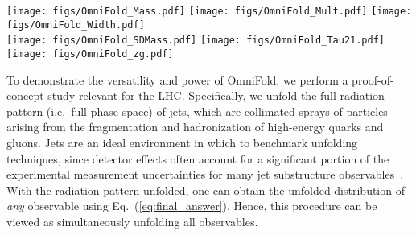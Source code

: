 \documentclass[prl,twocolumn,superscriptaddress,longbibliography,preprintnumbers,nofootinbib]{revtex4-1}
\DeclareRobustCommand{\Eq}[1]{Eq.~(\ref{eq:#1})}
\newcommand{\Pythia}{{\sc Pythia}\xspace}
\newcommand{\Herwig}{{\sc Herwig}\xspace}
\newcommand{\OmniFold}{{\sc OmniFold}\xspace}
\begin{document}
\begin{figure*}[t]
    \centering
    \texttt{[image: figs/OmniFold\_Mass.pdf]}
    \texttt{[image: figs/OmniFold\_Mult.pdf]}
    \texttt{[image: figs/OmniFold\_Width.pdf]}\\
    \texttt{[image: figs/OmniFold\_SDMass.pdf]}
    \texttt{[image: figs/OmniFold\_Tau21.pdf]}
    \texttt{[image: figs/OmniFold\_zg.pdf]}
    \caption{
    \label{fig:unfoldmultiple}
    The unfolding results for six jet substructure observables, using \Herwig~7.1.5 (``Data''/``Truth'') and \Pythia~8.243 tune 26 (Sim./Gen.), unfolded with \OmniFold and compared to IBU.
    \OmniFold matches or exceeds the unfolding performance of IBU on all of these observables.
    We emphasize that \OmniFold is a single general unfolding procedure, whereas unfolding with IBU must be done observable by observable.
    Statistical uncertainties are shown only in the ratio panel.
    }
\end{figure*}

To demonstrate the versatility and power of \OmniFold, we perform a proof-of-concept study relevant for the LHC.
%
Specifically, we unfold the full radiation pattern (i.e.~full phase space) of jets, which are collimated sprays of particles arising from the fragmentation and hadronization of high-energy quarks and gluons.
%
Jets are an ideal environment in which to benchmark unfolding techniques, since detector effects often account for a significant portion of the experimental measurement uncertainties for many jet substructure observables~\cite{Asquith:2018igt}.
%
With the radiation pattern unfolded, one can obtain the unfolded distribution of \emph{any} observable using \Eq{final_answer}.
%
Hence, this procedure can be viewed as simultaneously unfolding all observables.
\end{document}
